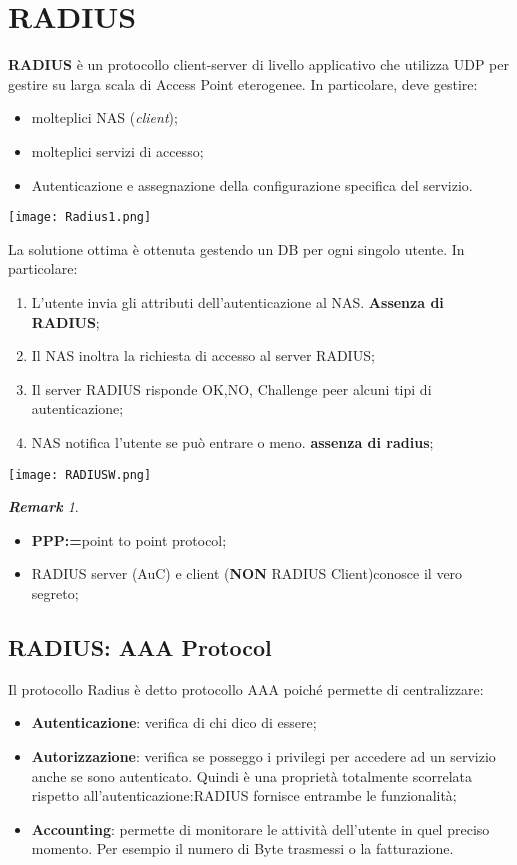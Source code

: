 \documentclass{article}
\theoremstyle{remark}
\newtheorem*{remark}{\textbf{Remark}}
\begin{document}
\section{RADIUS}
\textbf{RADIUS} è un protocollo client-server di livello applicativo che utilizza UDP per gestire su larga scala di Access Point eterogenee. In particolare, deve gestire:\begin{itemize}
    \item molteplici NAS (\emph{client});
    \item molteplici servizi di accesso;
    \item Autenticazione e assegnazione della configurazione specifica del servizio.
\end{itemize}
\begin{center}
    \texttt{[image: Radius1.png]}
\end{center}
La solutione ottima è ottenuta gestendo un DB per ogni singolo utente. In particolare:\begin{enumerate}
    \item L'utente invia gli attributi dell'autenticazione al NAS. \textbf{Assenza di RADIUS};
    \item Il NAS inoltra la richiesta di accesso al server RADIUS;
    \item Il server RADIUS risponde OK,NO, Challenge peer alcuni tipi di autenticazione;
    \item NAS notifica l'utente se può entrare o meno. \textbf{assenza di radius};
\end{enumerate}
\begin{center}
    \texttt{[image: RADIUSW.png]}
\end{center}
\begin{remark}
\begin{itemize}
    \item \textbf{PPP:=}point to point protocol;
    \item RADIUS server (AuC) e client (\textbf{NON} RADIUS Client)conosce il vero segreto;
\end{itemize}
\end{remark}
\subsection{RADIUS: AAA Protocol}
Il protocollo Radius è detto protocollo AAA poiché permette di centralizzare:\begin{itemize}
    \item \textbf{Autenticazione}: verifica di chi dico di essere;
    \item \textbf{Autorizzazione}: verifica se posseggo i privilegi per accedere ad un servizio anche se sono autenticato. Quindi è una proprietà totalmente scorrelata rispetto all'autenticazione:RADIUS fornisce entrambe le funzionalità;
    \item \textbf{Accounting}: permette di monitorare le attività dell'utente in quel preciso momento. Per esempio il numero di Byte trasmessi o la fatturazione.
\end{itemize}
\end{document}
